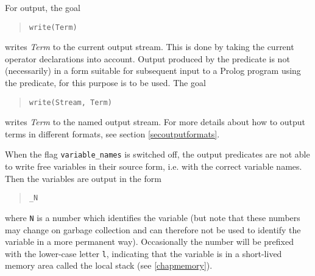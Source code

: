 For output, the goal \begin{quote}\begin{verbatim}
write(Term)\end{verbatim}\end{quote} writes {\it Term} to the current output stream.
This is done by taking the current operator declarations into account. Output
produced by the  predicate is not (necessarily) in
a form suitable for subsequent input to a Prolog program using the 
predicate, for this purpose  is to be used.
The goal \begin{quote}\begin{verbatim}
write(Stream, Term)\end{verbatim}\end{quote} writes {\it Term} to the
named output stream.
For more details about how to output terms in different formats, see
section \ref{secoutputformats}.



When the flag {\tt variable_names} is switched off,
the output predicates are not able to write free variables
in their source form, i.e. with the correct variable names.
Then the variables are output in the form
\begin{quote}\begin{verbatim}
_N\end{verbatim}\end{quote}
where {\tt N} is a number which identifies the variable (but note that these
numbers may change on garbage collection and can therefore not be used to
identify the variable in a more permanent way).
Occasionally the number will be prefixed with the lower-case letter {\tt l},
indicating that the variable is in a short-lived memory area called the
local stack (see \ref{chapmemory}).

